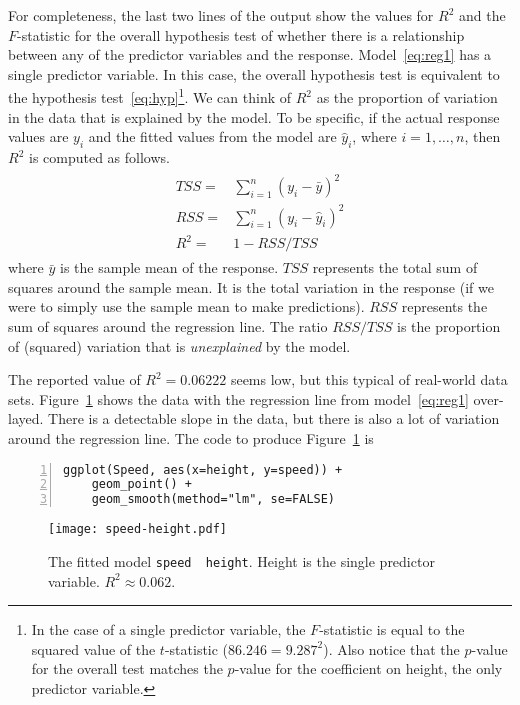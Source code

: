 For completeness, the last two lines of the output show the values for
$R^2$ and the $F$-statistic for the overall hypothesis test of whether
there is a relationship between any of the predictor variables and the
response.  Model~\ref{eq:reg1} has a single predictor variable. In
this case, the overall hypothesis test is equivalent to the hypothesis
test~\ref{eq:hyp}\footnote{In the case of a single predictor
  variable, the $F$-statistic is equal to the squared value of the
  $t$-statistic ($86.246 = 9.287^2$).  Also notice that the $p$-value
  for the overall test matches the $p$-value for the coefficient on
  height, the only predictor variable.}.  We can think of $R^2$ as the
proportion of variation in the data that is explained by the
model. To be specific, if the actual response values are $y_i$ and the fitted
values from the model are $\hat{y}_i$, where $i=1,\ldots,n$, 
then $R^2$ is computed as follows.
\begin{align}
\begin{split}
TSS =& \sum_{i=1}^n \left( y_i - \bar{y} \right)^2\\
RSS =& \sum_{i=1}^n \left( y_i - \hat{y}_i \right)^2\\
R^2 =& 1 - RSS/TSS
\end{split}
\label{eq:R2}
\end{align}
where $\bar{y}$ is the sample mean of the response. $TSS$ represents
the total sum of squares around the sample mean. It is the total
variation in the response (if we were to simply use the sample mean to 
make predictions). $RSS$ represents the sum of squares around the
regression line.  The ratio $RSS/TSS$ is the proportion of (squared)
variation that is \emph{unexplained} by the model.

The reported value of $R^2 = 0.06222$ seems low, but this typical of
real-world data sets. Figure~\ref{fig:speed-height} shows the data
with the regression line from model~\ref{eq:reg1} over-layed.  There
is a detectable slope in the data, but there is also a lot of
variation around the regression line. The code to produce
Figure~\ref{fig:speed-height} is

\begin{Verbatim}[numbers=left,xleftmargin=5mm]
ggplot(Speed, aes(x=height, y=speed)) +
    geom_point() +
    geom_smooth(method="lm", se=FALSE)
\end{Verbatim}


\begin{figure}
\begin{center}
\texttt{[image: speed-height.pdf]}
\caption{The fitted model \texttt{speed~\mtilde~height}. Height is the 
single predictor variable. $R^2 \approx 0.062$.}
\label{fig:speed-height}
\end{center}
\end{figure}

